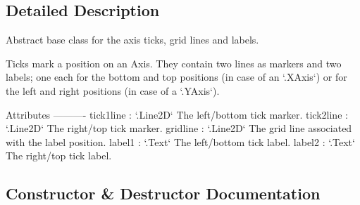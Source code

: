 \subsection{Detailed Description}
\begin{DoxyVerb}Abstract base class for the axis ticks, grid lines and labels.

Ticks mark a position on an Axis. They contain two lines as markers and
two labels; one each for the bottom and top positions (in case of an
`.XAxis`) or for the left and right positions (in case of a `.YAxis`).

Attributes
----------
tick1line : `.Line2D`
    The left/bottom tick marker.
tick2line : `.Line2D`
    The right/top tick marker.
gridline : `.Line2D`
    The grid line associated with the label position.
label1 : `.Text`
    The left/bottom tick label.
label2 : `.Text`
    The right/top tick label.\end{DoxyVerb}
 

\subsection{Constructor \& Destructor Documentation}
\mbox{\label{classmatplotlib_1_1axis_1_1Tick_a4d2b721fdb23ad919439c4dd1bfb22f9}} 
